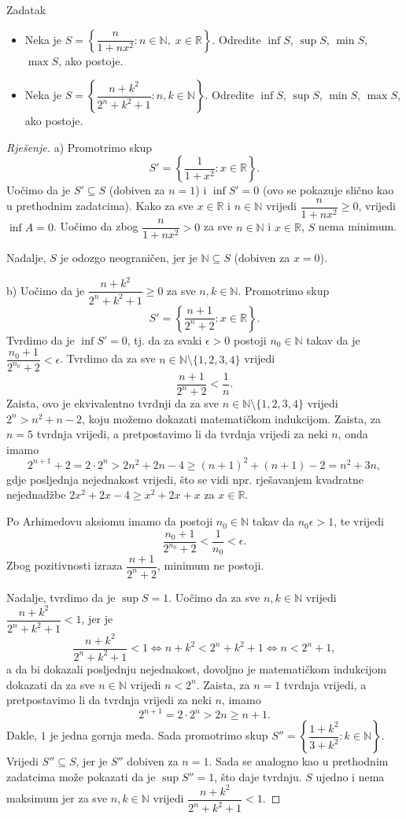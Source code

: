 \begin{exercise}{Zadatak} \textbf{}
\begin{itemize}
\item[a)] Neka je \(S=\left\{\dfrac{n}{1+nx^2} : n\in \mathbb{N},\; x\in \mathbb{R}\right\}\). Odredite $\inf{S}$, $\sup{S}$, $\min{S}$, $\max{S}$, ako postoje.
\item[b)] Neka je \(S=\left\{\dfrac{n+k^2}{2^n+k^2+1} : n, k\in \mathbb{N}\right\}\). Odredite $\inf{S}$, $\sup{S}$, $\min{S}$, $\max{S}$, ako postoje.
\end{itemize}
\end{exercise}
\begin{proof}[Rješenje]
a) Promotrimo skup
\[S'=\left\{\dfrac{1}{1+x^2} : x\in \mathbb{R}\right\}.\]
Uočimo da je \(S'\subseteq S\) (dobiven za \(n=1\)) i \(\inf{S'}=0\) (ovo se pokazuje slično kao u prethodnim zadatcima). Kako za sve \(x\in \mathbb{R}\) i \(n\in \mathbb{N}\) vrijedi \(\dfrac{n}{1+nx^2}\geq 0\), vrijedi \(\inf{A}=0\). Uočimo da zbog $\dfrac{n}{1+nx^2}>0$ za sve $n\in \mathbb{N}$ i $x\in \mathbb{R}$, $S$ nema minimum.

Nadalje, $S$ je odozgo neograničen, jer je $\mathbb{N}\subseteq S$ (dobiven za $x=0$).

b) Uočimo da je $\dfrac{n+k^2}{2^n+k^2+1}\geq 0$ za sve $n, k\in \mathbb{N}$. Promotrimo skup
\[S'=\left\{\dfrac{n+1}{2^n+2} : x\in \mathbb{R}\right\}.\]
Tvrdimo da je $\inf{S'}=0$, tj. da za svaki $\epsilon>0$ postoji $n_0\in \mathbb{N}$ takav da je $\dfrac{n_0+1}{2^{n_0}+2}<\epsilon$. Tvrdimo da za sve $n\in \mathbb{N}\setminus\{1, 2, 3, 4\}$ vrijedi
$$\dfrac{n+1}{2^n+2}< \dfrac{1}{n}.$$
Zaista, ovo je ekvivalentno tvrdnji da za sve $n\in \mathbb{N}\setminus\{1, 2, 3, 4\}$ vrijedi $2^n>n^2+n-2$, koju možemo dokazati matematičkom indukcijom. Zaista, za $n=5$ tvrdnja vrijedi, a pretpostavimo li da tvrdnja vrijedi za neki $n$, onda imamo
$$2^{n+1}+2=2\cdot 2^n>2n^2+2n-4\geq (n+1)^2+(n+1)-2=n^2+3n,$$
gdje posljednja nejednakost vrijedi, što se vidi npr. rješavanjem kvadratne nejednadžbe $2x^2+2x-4\geq x^2+2x+x$ za $x\in \mathbb{R}$.

Po Arhimedovu aksiomu imamo da postoji $n_0\in \mathbb{N}$ takav da $n_0\epsilon>1$, te vrijedi
$$\dfrac{n_0+1}{2^{n_0}+2}< \dfrac{1}{n_0}<\epsilon.$$
Zbog pozitivnosti izraza $\dfrac{n+1}{2^n+2}$, minimum ne postoji.

Nadalje, tvrdimo da je $\sup{S}=1$. Uočimo da za sve $n, k\in \mathbb{N}$ vrijedi $\dfrac{n+k^2}{2^n+k^2+1}< 1$, jer je
$$\dfrac{n+k^2}{2^n+k^2+1}< 1\Leftrightarrow n+k^2< 2^n+k^2+1\Leftrightarrow n< 2^n+1,$$
a da bi dokazali posljednju nejednakost, dovoljno je matematičkom indukcijom dokazati da za sve $n\in \mathbb{N}$ vrijedi $n< 2^n$. Zaista, za $n=1$ tvrdnja vrijedi, a pretpostavimo li da tvrdnja vrijedi za neki $n$, imamo $$2^{n+1}=2\cdot 2^n> 2n\geq n+1.$$
Dakle, $1$ je jedna gornja međa. Sada promotrimo skup $S''=\left\{\dfrac{1+k^2}{3+k^2} : k\in \mathbb{N}\right\}$. Vrijedi $S''\subseteq S$, jer je $S''$ dobiven za $n=1$. Sada se analogno kao u prethodnim zadatcima može pokazati da je $\sup{S''}=1$, što daje tvrdnju. $S$ ujedno i nema maksimum jer za sve $n, k\in \mathbb{N}$ vrijedi $\dfrac{n+k^2}{2^n+k^2+1}< 1$.
\end{proof}
